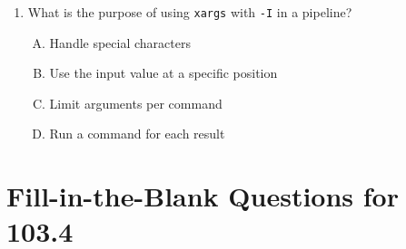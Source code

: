 \documentclass[a4paper]{report}
\begin{document}
\begin{enumerate}[1.]
    \item What is the purpose of using \texttt{xargs} with \texttt{-I} in a pipeline?  
    \begin{enumerate}[A)]
        \item Handle special characters  
        \item Use the input value at a specific position  
        \item Limit arguments per command  
        \item Run a command for each result  
    \end{enumerate}

\end{enumerate}

\newpage
\section*{Fill-in-the-Blank Questions for 103.4}
\end{document}
